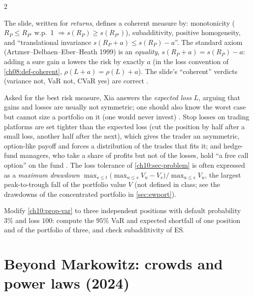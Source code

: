 \begin{paracol}{2}
\begin{coursenote}
The slide, written for \emph{returns}, defines a coherent measure by: monotonicity ($R_P\le R_{P'}$ w.p.~1 $\Rightarrow s(R_P)\ge s(R_{P'})$),
subadditivity, positive homogeneity, and ``translational invariance $s(R_P+a)\le s(R_P)-a$''. The standard axiom
(Artzner--Delbaen--Eber--Heath 1999) is an \emph{equality}, $s(R_P+a)=s(R_P)-a$: adding a sure gain $a$ lowers the risk by
exactly $a$ (in the loss convention of \cref{ch08:def-coherent}, $\rho(L+a)=\rho(L)+a$). The slide's ``coherent'' verdicts
(variance not, VaR not, CVaR yes) are correct .
\end{coursenote}

\begin{finance}
Asked for the best risk measure, Xia answers the \emph{expected loss} $L$, arguing that gains and losses are
usually not symmetric; one should also know the worst case but cannot size a portfolio on it (one would never invest) . Stop losses on trading platforms are set tighter than the
expected loss (cut the position by half after a small loss, another half after the next), which gives the
trader an asymmetric, option-like payoff and forces a distribution of the trades that fits it; and hedge-fund managers,
who take a share of profits but not of the losses, hold ``a free call option'' on the fund
. The loss tolerance of \cref{ch10:sec-problem} is often expressed as a
\emph{maximum drawdown} $\max_{s\le t}\bigl(\max_{u\le s}V_u-V_s\bigr)/\max_{u\le s}V_u$, the largest peak-to-trough fall of
the portfolio value $V$ (not defined in class; see the drawdowns of the concentrated portfolio in \cref{sec:ewport}).
\end{finance}

\begin{exercise}
Modify \cref{ch10:prop-var} to three independent positions with default probability $3\%$ and loss $100$: compute the
$95\%$ VaR and expected shortfall of one position and of the portfolio of three, and check subadditivity of ES.
\end{exercise}

\section{Beyond Markowitz: crowds and power laws (2024)}\label{ch10:sec-crowd}


\end{paracol}

